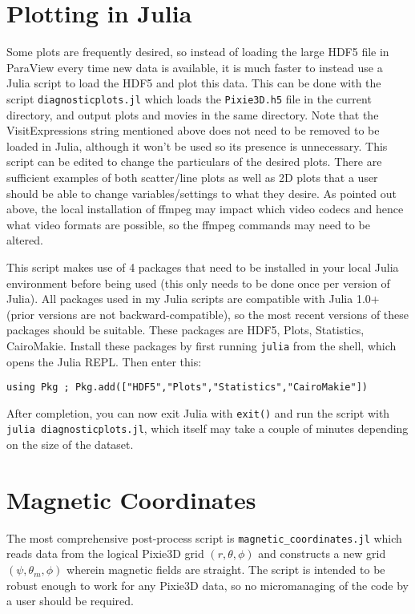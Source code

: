 \documentclass[12pt]{article}
\begin{document}
\section*{Plotting in Julia}
Some plots are frequently desired, so instead of loading the large HDF5 file in ParaView every time new data is available, it is much faster to instead use a Julia script to load the HDF5 and plot this data.
This can be done with the script \texttt{diagnosticplots.jl} which loads the \texttt{Pixie3D.h5} file in the current directory, and output plots and movies in the same directory.
Note that the VisitExpressions string mentioned above does not need to be removed to be loaded in Julia, although it won't be used so its presence is unnecessary.
This script can be edited to change the particulars of the desired plots.
There are sufficient examples of both scatter/line plots as well as 2D plots that a user should be able to change variables/settings to what they desire.
As pointed out above, the local installation of ffmpeg may impact which video codecs and hence what video formats are possible, so the ffmpeg commands may need to be altered.

This script makes use of 4 packages that need to be installed in your local Julia environment before being used (this only needs to be done once per version of Julia).
All packages used in my Julia scripts are compatible with Julia 1.0+ (prior versions are not backward-compatible), so the most recent versions of these packages should be suitable.
These packages are HDF5, Plots, Statistics, CairoMakie.
Install these packages by first running \texttt{julia} from the shell, which opens the Julia REPL.
Then enter this:

\texttt{using Pkg ; Pkg.add(["HDF5","Plots","Statistics","CairoMakie"])}

After completion, you can now exit Julia with \texttt{exit()} and run the script with \texttt{julia diagnosticplots.jl}, which itself may take a couple of minutes depending on the size of the dataset.

\section*{Magnetic Coordinates}
The most comprehensive post-process script is \texttt{magnetic\_coordinates.jl} which reads data from the logical Pixie3D grid $(r,\theta,\phi)$ and constructs a new grid 
$(\psi,\theta_m,\phi)$ wherein magnetic fields are straight.
The script is intended to be robust enough to work for any Pixie3D data, so no micromanaging of the code by a user should be required.
\end{document}
